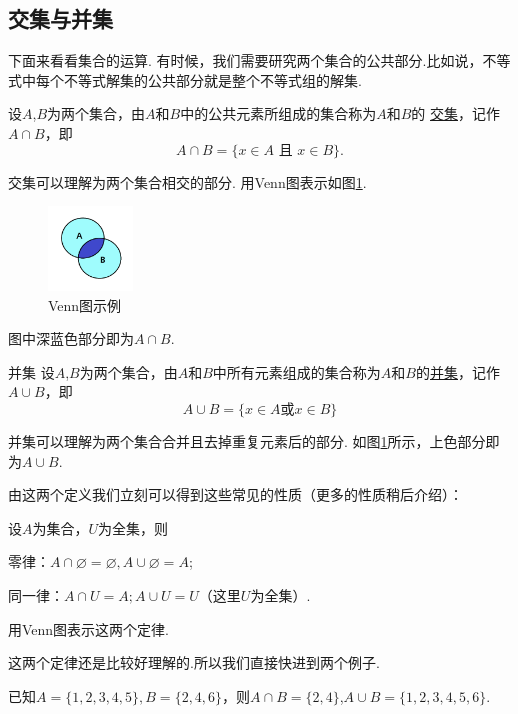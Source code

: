 \documentclass[lang=cn,math=cm,chinesefont=nofont,11pt,scheme=chinese,twocol]{elegantbook}
\begin{document}
\subsection{交集与并集}
下面来看看集合的运算.
有时候，我们需要研究两个集合的公共部分.比如说，不等式中每个不等式解集的公共部分就是整个不等式组的解集.
\begin{definition}[交集]
  设$A$,$B$为两个集合，由$A$和$B$中的公共元素所组成的集合称为$A$和$B$的
  \underline{交集}，记作$A\cap B$，即$$A\cap B=\{x\in A\text{ 且 }x\in B\}.$$
\end{definition}
  交集可以理解为两个集合相交的部分.
  用Venn图表示如图\ref{img:Venn2}.
  \begin{figure}[h]
    \centering
    \includegraphics[width=0.2\textwidth]{image/Venn2.png}
    \caption{Venn图示例}
    \label{img:Venn2}
  \end{figure}
  图中深蓝色部分即为$A\cap B$.

\begin{definition}{并集}
  设$A$,$B$为两个集合，由$A$和$B$中所有元素组成的集合称为$A$和$B$的\underline{并集}，记作$A\cup B$，即
  $$A\cup B=\{x\in A\text{或}x\in B\}$$
\end{definition}
  并集可以理解为两个集合合并且去掉重复元素后的部分.
  如图\ref{img:Venn2}所示，上色部分即为$A\cup B$. 

由这两个定义我们立刻可以得到这些常见的性质（更多的性质稍后介绍）：

设$A$为集合，$U$为全集，则
\begin{property}
  零律：$A\cap\varnothing =\varnothing,A\cup\varnothing=A$;
\end{property}
\begin{property}
  同一律：$A\cap U=A;A\cup U=U$（这里$U$为全集）.
\end{property}

\begin{exercise}\label{exer:10}
  用Venn图表示这两个定律.
\end{exercise}


这两个定律还是比较好理解的.所以我们直接快进到两个例子.

\begin{example}
  已知$A=\{1,2,3,4,5\},B=\{2,4,6\}$，则$A\cap B=\{2,4\}$,$A\cup B=\{1,2,3,4,5,6\}$.
\end{example}
\end{document}
